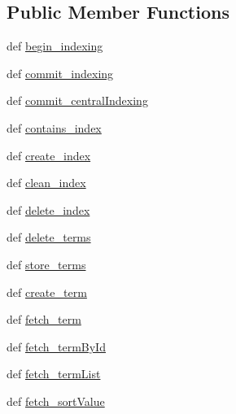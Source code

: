 \subsection*{Public Member Functions}
\begin{DoxyCompactItemize}
\item 
def \hyperlink{classcheshire3_1_1base_objects_1_1_index_store_ad496cd89871ae4e42547636958c663a9}{begin\-\_\-indexing}
\item 
def \hyperlink{classcheshire3_1_1base_objects_1_1_index_store_a36d4bb49c86991021f56f32c29ea15ab}{commit\-\_\-indexing}
\item 
def \hyperlink{classcheshire3_1_1base_objects_1_1_index_store_ab9358571ada3cb5d1f3ddc5eedaccd3c}{commit\-\_\-central\-Indexing}
\item 
def \hyperlink{classcheshire3_1_1base_objects_1_1_index_store_a27ba905279e32045ed438a89b046b4bd}{contains\-\_\-index}
\item 
def \hyperlink{classcheshire3_1_1base_objects_1_1_index_store_a691e3da9ee84d63a5a9862a6a37fc8e1}{create\-\_\-index}
\item 
def \hyperlink{classcheshire3_1_1base_objects_1_1_index_store_af92829dd9caa3548560f65532a5d07ab}{clean\-\_\-index}
\item 
def \hyperlink{classcheshire3_1_1base_objects_1_1_index_store_ae417145ab0d92dec2db01a2825c58fc8}{delete\-\_\-index}
\item 
def \hyperlink{classcheshire3_1_1base_objects_1_1_index_store_a9c0a1a3a2c37cc6ed948bb7c32f176ef}{delete\-\_\-terms}
\item 
def \hyperlink{classcheshire3_1_1base_objects_1_1_index_store_a6e017e47befe2f6a9edf05b37b4447ce}{store\-\_\-terms}
\item 
def \hyperlink{classcheshire3_1_1base_objects_1_1_index_store_a12af3612cf194976356a368f5edbe882}{create\-\_\-term}
\item 
def \hyperlink{classcheshire3_1_1base_objects_1_1_index_store_a21c44be3d2b022bfe382f99572268f35}{fetch\-\_\-term}
\item 
def \hyperlink{classcheshire3_1_1base_objects_1_1_index_store_a6660e59013f8a81a42f8dddaa66b2945}{fetch\-\_\-term\-By\-Id}
\item 
def \hyperlink{classcheshire3_1_1base_objects_1_1_index_store_a2cbd3750f67123e72cd1047ede9ac317}{fetch\-\_\-term\-List}
\item 
def \hyperlink{classcheshire3_1_1base_objects_1_1_index_store_a53bdf8b7844407eed797ecd11d2e5108}{fetch\-\_\-sort\-Value}
\item 

\end{DoxyCompactItemize}
